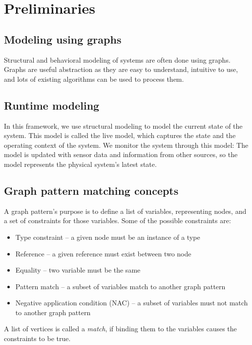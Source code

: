 
\chapter{Preliminaries}



\section{Modeling using graphs}

Structural and behavioral modeling of systems are often done using graphs. Graphs are useful abstraction as they are easy to understand, intuitive to use, and lots of existing algorithms can be used to process them.

\section{Runtime modeling}

In this framework, we use structural modeling to model the current state of the system. This model is called the live model, which captures the state and the operating context of the system. We monitor the system through this model: The model is updated with sensor data and information from other sources, so the model represents the physical system's latest state. 

\section{Graph pattern matching concepts}

A graph pattern's purpose is to define a list of variables, representing nodes, and a set of constraints for those variables. Some of the possible constraints are:

\begin{itemize}
	\item Type constraint -- a given node must be an instance of a type
	\item Reference -- a given reference must exist between two node
	\item Equality -- two variable must be the same
	\item Pattern match -- a subset of variables match to another graph pattern
	\item Negative application condition (NAC) -- a subset of variables must not match to another graph pattern
\end{itemize}
A list of vertices is called a \emph{match}, if binding them to the variables causes the constraints to be true.


